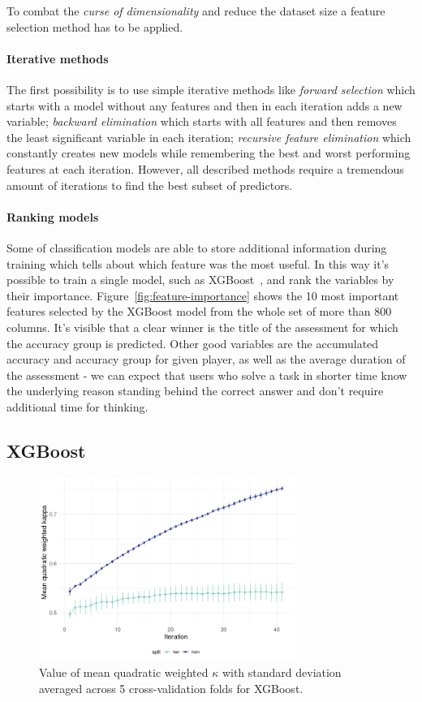 \documentclass[fleqn,10pt]{SelfArx} %
\begin{document}
To combat the \textit{curse of dimensionality} and reduce the dataset size a feature selection method has to be applied.
\paragraph{Iterative methods}
The first possibility is to use simple iterative methods like \textit{forward selection} which starts with a model without any features and then in each iteration adds a new variable; \textit{backward elimination} which starts with all features and then removes the least significant variable in each iteration; \textit{recursive feature elimination} which constantly creates new models while remembering the best and worst performing features at each iteration.
However, all described methods require a tremendous amount of iterations to find the best subset of predictors.
\paragraph{Ranking models}
Some of classification models are able to store additional information during training which tells about which feature was the most useful.
In this way it's possible to train a single model, such as XGBoost~\cite{xgboost}, and rank the variables by their importance.
Figure~\ref{fig:feature-importance} shows the 10 most important features selected by the XGBoost model from the whole set of more than 800 columns.
It's visible that a clear winner is the title of the assessment for which the accuracy group is predicted.
Other good variables are the accumulated accuracy and accuracy group for given player, as well as the average duration of the assessment - we can expect that users who solve a task in shorter time know the underlying reason standing behind the correct answer and don't require additional time for thinking.

\subsection{XGBoost}

\begin{figure}
    \centering
    \includegraphics[width=\linewidth,height=6cm]{images/xgboost_cv.png}
    \caption{Value of mean quadratic weighted $\kappa$ with standard deviation averaged across 5 cross-validation folds for XGBoost.}
    \label{fig:xgboost-cv}
\end{figure}
\end{document}
